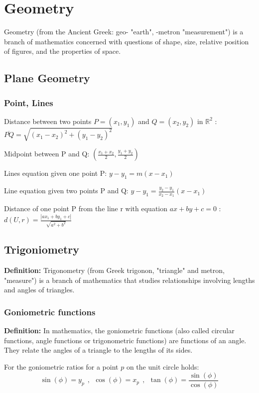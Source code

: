 \chapter{Geometry}
Geometry (from the Ancient Greek: geo- "earth", -metron "measurement") is a branch of mathematics concerned with questions of shape, size, relative position of figures, and the properties of space.







\section{Plane Geometry}
\subsection{Point, Lines}
Distance between two points $P=(x_1,y_1)$ and $Q=(x_2,y_2)$ in $\mathbb{R}^2$ : $ \overline{PQ} = \sqrt{(x_1-x_2)^2+(y_1-y_2)^2} $

Midpoint between P and Q: $\left(\frac{x_1+x_2}{2},\frac{y_1+y_2}{2}\right)$

Lines equation given one point P: $ y-y_1 = m(x-x_1) $

Line equation given two points P and Q: $ y-y_1 = \frac{y_2-y_1}{x_2-x_1}(x-x_1) $

Distance of one point P from the line r with equation $ax+by+c=0$ : $ d(U,r) = \frac{\left|ax_1+by_1+c\right|}{\sqrt{a^2+b^2}}$



\section{Trigoniometry}
\textbf{Definition:} Trigonometry (from Greek trigonon, "triangle" and metron, "measure") is a branch of mathematics that studies relationships involving lengths and angles of triangles.

\subsection{Goniometric functions}
\textbf{Definition:} In mathematics, the goniometric functions (also called circular functions, angle functions or trigonometric functions) are functions of an angle. They relate the angles of a triangle to the lengths of its sides. 

For the goniometric ratios for a point $p$ on the unit circle holds:
\[
\sin(\phi)=y_p~~,~~\cos(\phi)=x_p~~,~~\tan(\phi)=\frac{\sin(\phi)}{\cos(\phi)}
\]

